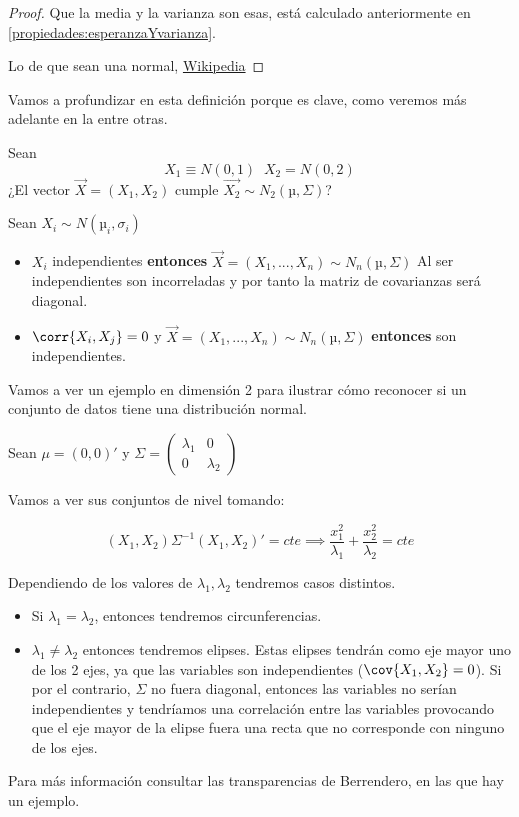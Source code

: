 \begin{proof}

Que la media y la varianza son esas, está calculado anteriormente en \ref{propiedades:esperanzaYvarianza}.

Lo de que sean una normal, \href{https://en.wikipedia.org/wiki/Normally_distributed_and_uncorrelated_does_not_imply_independent}{Wikipedia}


\end{proof}


Vamos a profundizar en esta definición porque es clave, como veremos más adelante en la  entre otras.

Sean \[X_1 \equiv N(0,1)\;\; X_2 = N(0,2)\] ¿El vector $\vec{X}= (X_1,X_2)$ cumple $\vec{X_2}\sim N_2 (µ,Σ)$?

\begin{prop}
\label{prop:NormalidadConjuntaIncorrelacionIndependencia}
Sean $X_i \sim N(µ_i,σ_i)$
\begin{itemize}
	\item $X_i$ independientes \textbf{entonces} $\vec{X} = (X_1,...,X_n) \sim N_n(µ,Σ)$
	\subitem Al ser independientes son incorreladas y por tanto la matriz de covarianzas será diagonal.
	\item $\corr{X_i,X_j} = 0$ y $\vec{X} = (X_1,...,X_n) \sim N_n(µ,Σ)$ \textbf{entonces} son independientes.
\end{itemize}
\end{prop}


\begin{example}
Vamos a ver un ejemplo en dimensión 2 para ilustrar cómo reconocer si un conjunto de datos tiene una distribución normal.

Sean $μ = (0,0)'$ y $Σ = \begin{pmatrix} λ_1 & 0 \\ 0 & λ_2 \end{pmatrix}$

Vamos a ver sus conjuntos de nivel tomando:

\[(X_1,X_2) Σ^{-1} (X_1,X_2)' = cte \implies \frac{x_1^2}{λ_1} + \frac{x_2^2}{λ_2} = cte\]


Dependiendo de los valores de $λ_1,λ_2$ tendremos casos distintos.

\begin{itemize}
	\item Si $λ_1 = λ_2$, entonces tendremos circunferencias.
	\item $λ_1 ≠ λ_2$ entonces tendremos elipses.
	\subitem
	Estas elipses tendrán como eje mayor uno de los 2 ejes, ya que las variables son independientes ($\cov{X_1,X_2} = 0$).
	\subitem Si por el contrario, $Σ$ no fuera diagonal, entonces las variables no serían independientes y tendríamos una correlación entre las variables provocando que el eje mayor de la elipse fuera una recta que no corresponde con ninguno de los ejes.
\end{itemize}


Para más información consultar las transparencias de Berrendero, en las que hay un ejemplo.

\end{example}


